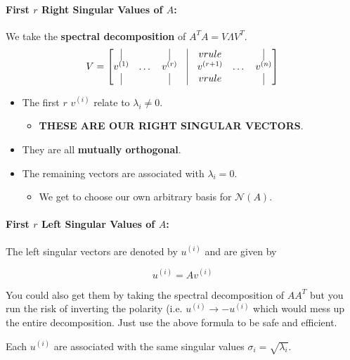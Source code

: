 \documentclass[a4paper,12pt]{report}
\begin{document}
\paragraph{First $r$ Right Singular Values of $A$: } We take the \textbf{spectral decomposition} 
of $A^TA = V\Lambda V^T$.
\begin{equation}
V = 
\begin{bmatrix}
	\vrule & & \vrule & \vrule & vrule & & \vrule \\
	v^{(1)} & \dots & v^{(r)} & \vrule & v^{(r+1)} & \dots & v^{(n)} \\
	\vrule & & \vrule & \vrule & vrule & & \vrule 
\end{bmatrix}
\end{equation}
\begin{itemize}
\item The first $r$ $v^{(i)}$ relate to $\lambda_i \neq 0$.
\begin{itemize}
	\item \textbf{THESE ARE OUR RIGHT SINGULAR VECTORS}.
\end{itemize}

\item They are all \textbf{mutually orthogonal}.
\item The remaining vectors are associated with $\lambda_i = 0$.
\begin{itemize} 
		\item We get to choose our own arbitrary basis for $\mathcal{N}(A)$.
\end{itemize}


\end{itemize}

\paragraph{First $r$ Left Singular Values of $A$: } The left singular vectors are denoted by $u^{(i)}$ and are given by

\begin{equation}
	u^{(i)} = Av^{(i)}
\end{equation}

You could also get them by taking the spectral decomposition of $AA^T$ but you run the risk of inverting the polarity (i.e. $u^{(i)} \to -u^{(i)}$ which would mess up the entire decomposition. Just use the above formula to be safe and efficient.

Each $u^{(i)}$ are associated with the same singular values $\sigma_i = \sqrt{\lambda_i}$.
\end{document}

